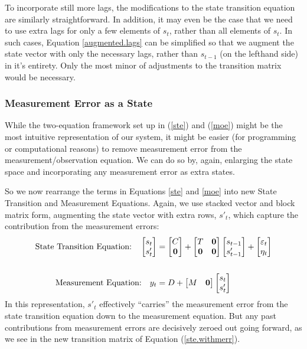 \documentclass[a4paper,12pt]{article}
\begin{document}
To incorporate still more lags, the modifications to the state transition equation are similarly straightforward. In addition, it may even be the case that we need to use extra lags for only a few elements of $s_t$, rather than all elements of $s_t$. In such cases, Equation \ref{augmented.lags} can be simplified so that we augment the state vector with only the necessary lags, rather than $s_{t-1}$ (on the lefthand side) in it's entirety. Only the most minor of adjustments to the transition matrix would be necessary.


\subsubsection{Measurement Error as a State}

While the two-equation framework set up in (\ref{ste}) and (\ref{moe}) might be the most intuitive representation of our system, it might be easier (for programming or computational reasons) to remove measurement error from the measurement/observation equation. We can do so by, again, enlarging the state space and incorporating any measurement error as extra states.

So we now rearrange the terms in Equations \ref{ste} and \ref{moe} into new State Transition and Measurement Equations. Again, we use stacked vector and block matrix form, augmenting the state vector with extra rows, $s'_t$, which capture the contribution from the measurement errors:
\begin{align}
  \text{State Transition Equation:} \quad
    \begin{bmatrix} s_{t} \\ s'_t \end{bmatrix}
    &= \begin{bmatrix} C \\ \mathbf{0} \end{bmatrix}
    + \begin{bmatrix} T & \mathbf{0} \\ 
    \mathbf{0} & \mathbf{0} \end{bmatrix}
    \begin{bmatrix} s_{t-1} \\ s'_{t-1} \end{bmatrix}
    + \begin{bmatrix} \varepsilon_{t} \\ \eta_t \end{bmatrix}
    \label{ste.withmerr}
  \\ \notag \\
  \text{Measurement Equation:} \quad
    y_{t} &= D + 
    \begin{bmatrix} M & \mathbf{0} \end{bmatrix}
    \begin{bmatrix} s_{t} \\ s'_t \end{bmatrix}
\end{align}
In this representation, $s'_t$ effectively ``carries'' the measurement error from the state transition equation down to the measurement equation. But any past contributions from measurement errors are decisively zeroed out going forward, as we see in the new transition matrix of Equation (\ref{ste.withmerr}).
\end{document}
